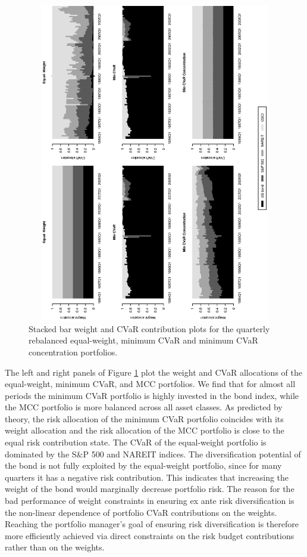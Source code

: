 \documentclass[12pt,a4paper]{article}
\begin{document}
\begin{figure}[tb]
\begin{center}
\caption{Stacked bar weight and CVaR contribution plots for the quarterly rebalanced equal-weight, minimum CVaR and minimum CVaR concentration portfolios. \label{fig:weightcvar_allocation_dynamic}} \vspace{-1cm}
\includegraphics[width=12cm,height=14cm,angle=270]{stackedweightsriskcont_benchmark_CC.eps}
\end{center}
\end{figure}

The left and right panels of Figure \ref{fig:weightcvar_allocation_dynamic} plot the weight and CVaR allocations of the equal-weight, minimum CVaR, and MCC portfolios. We find that for almost all periods the minimum CVaR portfolio is highly invested in the bond index, while the MCC portfolio is more balanced across all asset classes. As predicted by theory, the risk allocation of the minimum CVaR portfolio coincides with its weight allocation and the risk allocation of the MCC portfolio is close to the equal risk contribution state. The CVaR of the equal-weight portfolio is dominated by the S\&P 500 and NAREIT indices. The diversification potential of the bond is not fully exploited by the equal-weight portfolio, since for many quarters it has a negative risk contribution. This indicates that increasing the weight of the bond would marginally decrease portfolio risk.  The reason for the bad performance of weight constraints in ensuring ex ante risk diversification is the non-linear dependence of portfolio CVaR contributions on the weights. Reaching the portfolio manager's goal of ensuring risk diversification is therefore more efficiently achieved via direct constraints on the risk budget contributions rather than on the weights.
\end{document}
